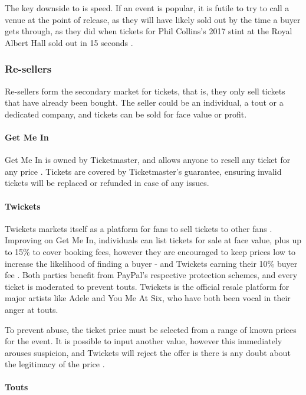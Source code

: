 \documentclass[12pt]{bhamdissertation}
\begin{document}
The key downside to is speed. If an event is popular, it is futile to try to call a venue at the point of release, as they will have likely sold out by the time a buyer gets through, as they did when tickets for Phil Collins's 2017 stint at the Royal Albert Hall sold out in 15 seconds \autocite{F16}.

\subsubsection{Re-sellers}

Re-sellers form the secondary market for tickets, that is, they only sell tickets that have already been bought. The seller could be an individual, a tout or a dedicated company, and tickets can be sold for face value or profit.

\paragraph{Get Me In}

Get Me In is owned by Ticketmaster, and allows anyone to resell any ticket for any price \autocite{T164}. Tickets are covered by Ticketmaster's guarantee, ensuring invalid tickets will be replaced or refunded in case of any issues.

\paragraph{Twickets}

Twickets markets itself as a platform for fans to sell tickets to other fans \autocite{Tw161}. Improving on Get Me In, individuals can list tickets for sale at face value, plus up to 15\% to cover booking fees, however they are encouraged to keep prices low to increase the likelihood of finding a buyer - and Twickets earning their 10\% buyer fee \autocite{Tw16}. Both parties benefit from PayPal's respective protection schemes, and every ticket is moderated to prevent touts. Twickets is the official resale platform for major artists like Adele and You Me At Six, who have both been vocal in their anger at touts.

To prevent abuse, the ticket price must be selected from a range of known prices for the event. It is possible to input another value, however this immediately arouses suspicion, and Twickets will reject the offer is there is any doubt about the legitimacy of the price \autocite{Tw162}.

\paragraph{Touts}
\end{document}
